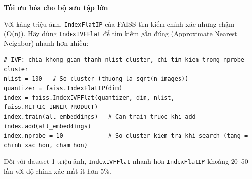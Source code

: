 \begin{mdframed}[style=infobox]
\textbf{Tối ưu hóa cho bộ sưu tập lớn}

Với hàng triệu ảnh, \texttt{IndexFlatIP} của FAISS tìm kiếm chính xác nhưng chậm (O(n)). Hãy dùng \texttt{IndexIVFFlat} để tìm kiếm gần đúng (Approximate Nearest Neighbor) nhanh hơn nhiều:

\begin{verbatim}
# IVF: chia khong gian thanh nlist cluster, chi tim kiem trong nprobe cluster
nlist = 100   # So cluster (thuong la sqrt(n_images))
quantizer = faiss.IndexFlatIP(dim)
index = faiss.IndexIVFFlat(quantizer, dim, nlist, faiss.METRIC_INNER_PRODUCT)
index.train(all_embeddings)   # Can train truoc khi add
index.add(all_embeddings)
index.nprobe = 10             # So cluster kiem tra khi search (tang = chinh xac hon, cham hon)
\end{verbatim}

Đối với dataset 1 triệu ảnh, \texttt{IndexIVFFlat} nhanh hơn \texttt{IndexFlatIP} khoảng 20--50 lần với độ chính xác mất ít hơn 5\%.
\end{mdframed}
